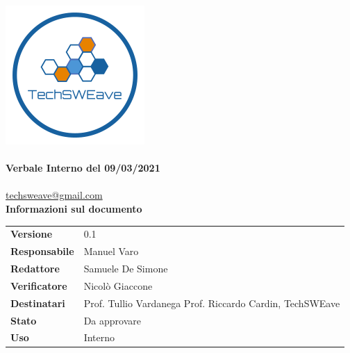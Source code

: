 \documentclass{article}
\begin{document}
\begin{titlepage}
    \begin{center}
        \includegraphics{../../../../Images/logo}\\
        \vspace{20px}
        \textcolor{logo}{\hrulefill}\\
        \vspace{20px}
        \textbf{\huge\textcolor{logo}{Verbale Interno del 09/03/2021}}\\
        \vspace{10px}
        \textcolor{logo}{\hrulefill}\\
        \vspace{20px}
        \href{mailto:techsweave@gmail.com}{techsweave@gmail.com}\\
        \vspace{40px}
        \textbf{Informazioni sul documento}\\
        \vspace{20px}
        \begin{tabular}{p{100px} | p{100px}}
            \textbf{Versione} & 0.1\\
            \textbf{Responsabile} & Manuel Varo\\
            \textbf{Redattore} & Samuele De Simone\\
            \textbf{Verificatore} & Nicolò Giaccone\\
            \textbf{Destinatari} & Prof. Tullio Vardanega \newline Prof. Riccardo Cardin, \newline TechSWEave\\
            \textbf{Stato} & Da approvare\\
            \textbf{Uso} & Interno\\
        \end{tabular}
            \vspace{1ex}

    \end{center}
    \end{titlepage}
    \tableofcontents
\end{document}
